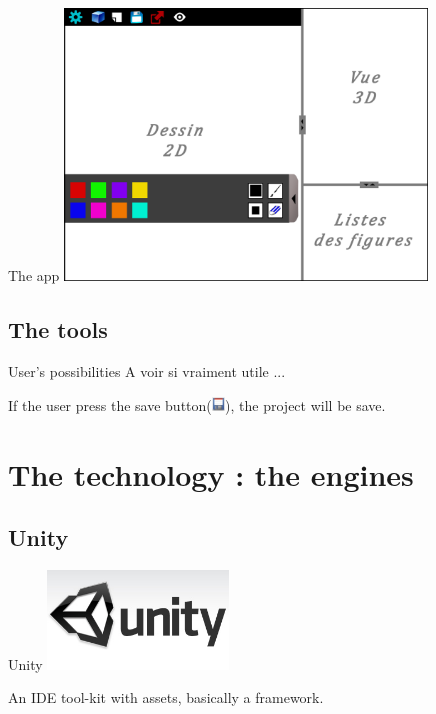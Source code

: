 \documentclass[a4paper,10pt]{beamer}
\begin{document}
			\begin{frame}{The app}
				\includegraphics[height=205pt]{images/AppliMenuOuvert.png}
			\end{frame}
			
		\subsection{The tools}
		
			\begin{frame}{User's possibilities}
				A voir si vraiment utile ...
				
				If the user press the save button(\includegraphics[height=10pt]{images/saveIcone.png}), the project will be save.
			\end{frame}
	
	\section{The technology : the engines}
	
		\subsection{Unity}
		
			\begin{frame}{Unity}
				\includegraphics[height=75pt]{images/Logo_Unity.jpg}
				
				 An IDE tool-kit with assets, basically a framework. 
			\end{frame}
			
\end{document}
